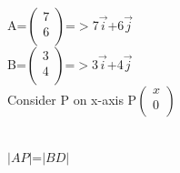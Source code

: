 \documentclass[10pt,a4paper]{report}
\begin{document}
\begin{multicols}{2}
A=$\begin{pmatrix}
  7 \\
  6 \\
 \end{pmatrix}$=$>$7$\vec{i}$+6$\vec{j}$\\              \vspace{1mm}
B=$\begin{pmatrix}
  3 \\
  4 \\
 \end{pmatrix}$=$>$3$\vec{i}$+4$\vec{j}$\\               \vspace{1mm}
Consider P on x-axis P$\begin{pmatrix}
  x \\
  0 \\
 \end{pmatrix}$\raggedright \\      \vspace{1mm}
$|AP|$=$|BD|$                        
 \vspace{3mm}\centering


\end{multicols}
\end{document}
